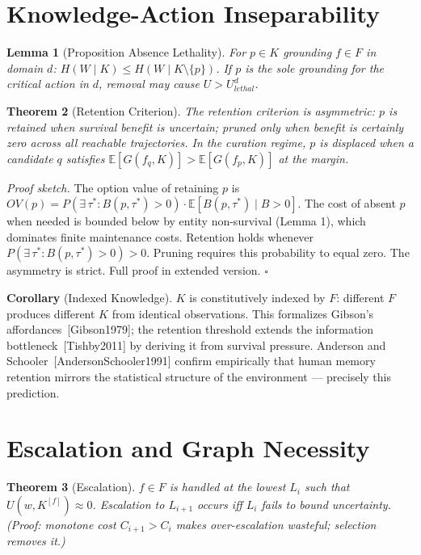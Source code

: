\documentclass[11pt]{article}
\newtheorem{theorem}{Theorem}
\newtheorem{lemma}[theorem]{Lemma}
\begin{document}
\section{Knowledge-Action Inseparability}

\begin{lemma}[Proposition Absence Lethality]
For $p \in K$ grounding $f \in F$ in domain $d$: $H(W \mid K) \leq H(W \mid K \setminus \{p\})$. If $p$ is the sole grounding for the critical action in $d$, removal may cause $U > U_{lethal}^d$.
\end{lemma}

\begin{theorem}[Retention Criterion]\label{thm:retention}
The retention criterion is asymmetric: $p$ is retained when survival benefit is uncertain; pruned only when benefit is certainly zero across all reachable trajectories. In the curation regime, $p$ is displaced when a candidate $q$ satisfies $\mathbb{E}[G(f_q, K)] > \mathbb{E}[G(f_p, K)]$ at the margin.
\end{theorem}

\emph{Proof sketch.} The option value of retaining $p$ is $OV(p) = P(\exists\,\tau^* : B(p,\tau^*) > 0) \cdot \mathbb{E}[B(p,\tau^*) \mid B > 0]$. The cost of absent $p$ when needed is bounded below by entity non-survival (Lemma 1), which dominates finite maintenance costs. Retention holds whenever $P(\exists\,\tau^* : B(p,\tau^*) > 0) > 0$. Pruning requires this probability to equal zero. The asymmetry is strict. Full proof in extended version. $\square$

\textbf{Corollary} (Indexed Knowledge). $K$ is constitutively indexed by $F$: different $F$ produces different $K$ from identical observations. This formalizes Gibson's affordances~[Gibson1979]; the retention threshold extends the information bottleneck~[Tishby2011] by deriving it from survival pressure. Anderson and Schooler~[AndersonSchooler1991] confirm empirically that human memory retention mirrors the statistical structure of the environment --- precisely this prediction.

\section{Escalation and Graph Necessity}

\begin{theorem}[Escalation]\label{thm:escalation}
$f \in F$ is handled at the lowest $L_i$ such that $U(w, K^{[f]}) \approx 0$. Escalation to $L_{i+1}$ occurs iff $L_i$ fails to bound uncertainty. (Proof: monotone cost $C_{i+1} > C_i$ makes over-escalation wasteful; selection removes it.)
\end{theorem}
\end{document}
